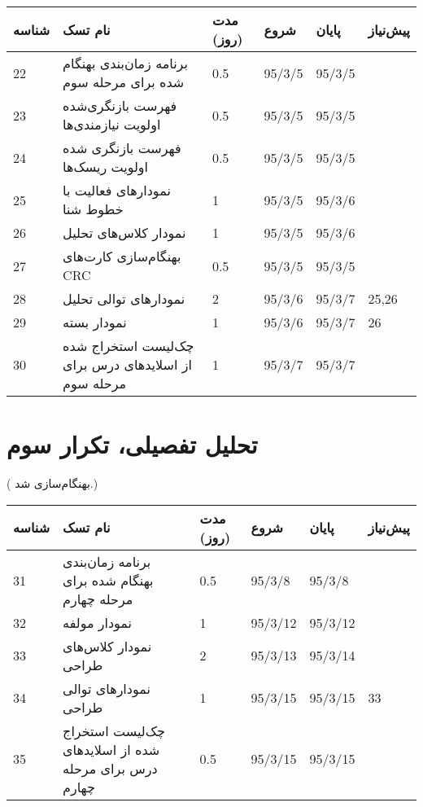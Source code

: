 \begin{tabular}[H]{ | l | l | l | l | l | l | }
	\hline
	شناسه & نام تسک & مدت (روز) & شروع & پایان & پیش‌نیاز    \\ \hline
	22 & برنامه زمان‌بندی  بهنگام شده برای مرحله سوم & 0.5   &   95/3/5 &   95/3/5 &      \\ \hline
	23 &  فهرست بازنگری‌شده اولویت نیازمندی‌ها & 0.5   &   95/3/5 &   95/3/5 &      \\ \hline
	24 &  فهرست بازنگری شده اولویت ریسک‌ها & 0.5   &   95/3/5 &   95/3/5 &      \\ \hline
	25 & نمودارهای فعالیت با خطوط شنا & 1   &   95/3/5 &   95/3/6 &      \\ \hline
	26 & نمودار کلاس‌های تحلیل & 1   &   95/3/5 &   95/3/6 &      \\ \hline
	27 & بهنگام‌سازی کارت‌های CRC & 0.5   &   95/3/5 &   95/3/5 &      \\ \hline
	28 & نمودارهای توالی تحلیل & 2   &   95/3/6 &   95/3/7 & 25,26    \\ \hline
	29 & نمودار بسته & 1   &   95/3/6 &   95/3/7 & 26    \\ \hline
	30 & چک‌‌لیست استخراج شده از اسلایدهای درس برای مرحله سوم & 1   &   95/3/7 &   95/3/7 &   \\ \hline
\end{tabular}

\section{تحلیل تفصیلی، تکرار سوم}	
({\color{red} بهنگام‌سازی شد.})

\begin{tabular}[H]{ | l | l | l | l | l | l | }
	\hline
	شناسه & نام تسک & مدت (روز) & شروع & پایان & پیش‌نیاز    \\ \hline
	31 & برنامه زمان‌بندی بهنگام شده برای مرحله چهارم & 0.5   &   95/3/8 &   95/3/8 &      \\ \hline
	32 & نمودار مولفه & 1 &   95/3/12 &   95/3/12 &      \\ \hline
	33 & نمودار کلاس‌های طراحی & 2   &   95/3/13 &   95/3/14 &      \\ \hline
	34 & نمودارهای توالی طراحی & 1   &   95/3/15 &   95/3/15 &   33   \\ \hline
	35 & چک‌‌لیست استخراج شده از اسلایدهای درس برای مرحله چهارم & 0.5   &   95/3/15 &   95/3/15 &    \\ \hline
\end{tabular}


\newpage
